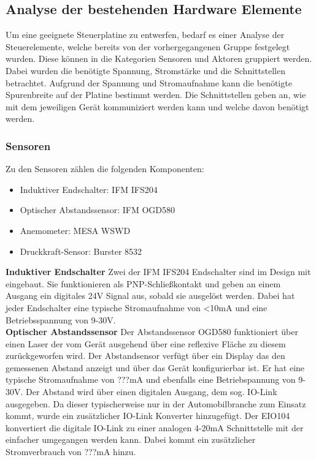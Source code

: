 \label{Analyze_der_Aktoren_und_Sensoren}
\subsection{Analyse der bestehenden Hardware Elemente}
Um eine geeignete Steuerplatine zu entwerfen, bedarf es einer Analyse der Steuerelemente, welche bereits von der vorhergegangenen Gruppe festgelegt wurden. Diese können in die Kategorien Sensoren und Aktoren gruppiert werden. Dabei wurden die benötigte Spannung, Stromstärke und die Schnittstellen betrachtet. Aufgrund der Spannung und Stromaufnahme kann die benötigte Spurenbreite auf der Platine bestimmt werden. Die Schnittstellen geben an, wie mit dem jeweiligen Gerät kommuniziert werden kann und welche davon benötigt werden.\\

\subsubsection{Sensoren}
Zu den Sensoren zählen die folgenden Komponenten:
\begin{itemize}
	\item Induktiver Endschalter: IFM IFS204
	\item Optischer Abstandssensor: IFM OGD580
	\item Anemometer: MESA WSWD
	\item Druckkraft-Sensor: Burster 8532
\end{itemize}

\noindent\textbf{Induktiver Endschalter}\newline
Zwei der IFM IFS204 Endschalter sind im Design mit eingebaut. Sie funktionieren als PNP-Schließkontakt und geben an einem Ausgang ein digitales 24V Signal aus, sobald sie ausgelöst werden. Dabei hat jeder Endschalter eine typische Stromaufnahme von <10mA und eine Betriebsspannung von 9-30V.\\

\noindent\textbf{Optischer Abstandssensor}\newline
Der Abstandssensor OGD580 funktioniert über einen Laser der vom Gerät ausgehend über eine reflexive Fläche zu diesem zurückgeworfen wird. Der Abstandsensor verfügt über ein Display das den gemessenen Abstand anzeigt und über das Gerät konfigurierbar ist. Er hat eine typische Stromaufnahme von ???mA und ebenfalls eine Betriebspannung von 9-30V. Der Abstand wird über einen digitalen Ausgang, dem sog. IO-Link ausgegeben. Da dieser typischerweise nur in der Automobilbranche zum Einsatz kommt, wurde ein zusätzlicher IO-Link Konverter hinzugefügt. Der EIO104 konvertiert die digitale IO-Link zu einer analogen 4-20mA Schnittstelle mit der einfacher umgegangen werden kann. Dabei kommt ein zusätzlicher Stromverbrauch von ???mA hinzu.\\

